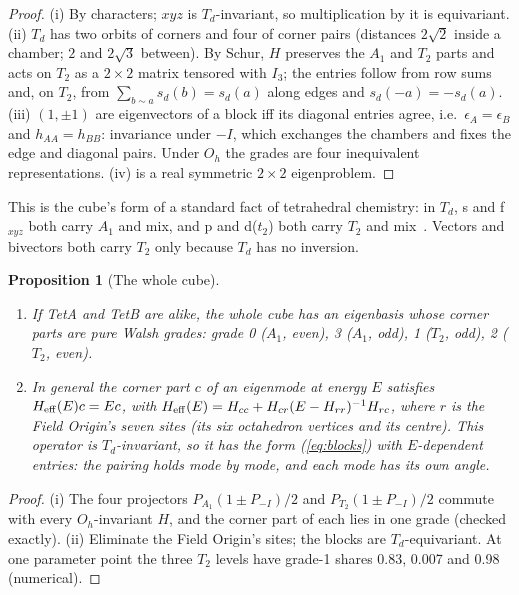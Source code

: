 \documentclass[twocolumn]{iopjournal}
\newtheorem{proposition}{Proposition}
\theoremstyle{definition}
\theoremstyle{remark}
\begin{document}
\begin{proof}
(i) By characters; $xyz$ is $T_d$-invariant, so multiplication by it is
equivariant. (ii) $T_d$ has two orbits of corners and four of corner pairs
(distances $2\sqrt2$ inside a chamber; $2$ and $2\sqrt3$ between). By
Schur, $H$ preserves the $A_1$ and $T_2$ parts and acts on $T_2$ as a
$2\times2$ matrix tensored with $I_3$; the entries follow from row sums and,
on $T_2$, from $\sum_{b \sim a}s_d(b) = s_d(a)$ along edges and $s_d(-a) =
-s_d(a)$. (iii) $(1, \pm1)$ are eigenvectors of a block iff its diagonal
entries agree, i.e.\ $\epsilon_A = \epsilon_B$ and $h_{AA} = h_{BB}$:
invariance under $-I$, which exchanges the chambers and fixes the edge and
diagonal pairs. Under $O_h$ the grades are four inequivalent
representations. (iv) is a real symmetric $2\times2$ eigenproblem.
\end{proof}

This is the cube's form of a standard fact of tetrahedral chemistry: in
$T_d$, s and f$_{xyz}$ both carry $A_1$ and mix, and p and d($t_2$) both
carry $T_2$ and mix~\cite{Cotton1990}. Vectors and bivectors both carry
$T_2$ only because $T_d$ has no inversion.

\begin{proposition}[The whole cube]
\label{prop:wholecube}
\begin{enumerate}
\item[(i)] If TetA and TetB are alike, the whole cube has an eigenbasis whose
  corner parts are pure Walsh grades: grade 0 ($A_1$, even), 3 ($A_1$,
  odd), 1 ($T_2$, odd), 2 ($T_2$, even).
\item[(ii)] In general the corner part $c$ of an eigenmode at energy $E$
  satisfies $H_{\rm eff}(E)c = Ec$, with $H_{\rm eff}(E) = H_{cc} +
  H_{cr}(E - H_{rr})^{-1}H_{rc}$, where $r$ is the Field Origin's seven
  sites (its six octahedron vertices and its centre). This operator is
  $T_d$-invariant, so it has the form (\ref{eq:blocks}) with
  $E$-dependent entries: the pairing holds mode by mode, and each mode has
  its own angle.
\end{enumerate}
\end{proposition}

\begin{proof}
(i) The four projectors $P_{A_1}(1 \pm P_{-I})/2$ and $P_{T_2}(1 \pm
P_{-I})/2$ commute with every $O_h$-invariant $H$, and the corner part of
each lies in one grade (checked exactly). (ii) Eliminate the Field
Origin's sites; the blocks are $T_d$-equivariant. At one parameter point
the three $T_2$ levels have grade-1 shares 0.83, 0.007 and 0.98
(numerical).
\end{proof}
\end{document}
